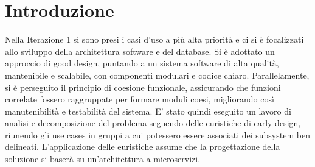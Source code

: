 \section{Introduzione}
Nella Iterazione 1 si sono presi i casi d'uso a più alta priorità e ci si è focalizzati allo sviluppo della architettura software e del database. 
Si è adottato un approccio di good design, puntando a un sistema software di alta qualità, mantenibile e scalabile, con componenti modulari e codice chiaro. Parallelamente, si è perseguito il principio di coesione funzionale, assicurando che funzioni correlate fossero raggruppate per formare moduli coesi, migliorando così manutenibilità e testabilità del sistema. E’ stato quindi eseguito un lavoro di analisi e decomposizione del problema seguendo delle euristiche di early design, riunendo gli use cases in gruppi a cui potessero essere associati dei subsystem ben delineati. L’applicazione delle euristiche assume che la progettazione della soluzione si baserà su un’architettura a microservizi.
\clearpage
